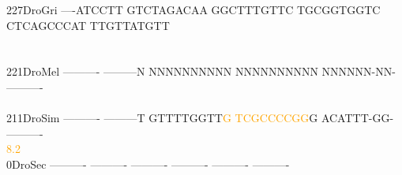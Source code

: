 \documentclass[11pt,twoside,reqno,a4paper]{article}
\begin{document}
{227\hspace*{1\charwidth}DroGri	----ATCCTT	GTCTAGACAA	GGCTTTGTTC	TGCGGTGGTC	CTCAGCCCAT	TTGTTATGTT	\\
\hspace*{4\charwidth}\hspace*{7\charwidth}\hspace*{1\charwidth}\hspace*{1\charwidth}\hspace*{1\charwidth}\hspace*{1\charwidth}\hspace*{1\charwidth}\hspace*{1\charwidth}\\
\\
221\hspace*{1\charwidth}DroMel	----------	---------N	NNNNNNNNNN	NNNNNNNNNN	NNNNNN-NN-	----------	\\
\hspace*{4\charwidth}\hspace*{7\charwidth}\hspace*{1\charwidth}\hspace*{1\charwidth}\hspace*{1\charwidth}\hspace*{1\charwidth}\hspace*{1\charwidth}\hspace*{1\charwidth}\\
211\hspace*{1\charwidth}DroSim	----------	---------T	GTTTTGGTT\textcolor{orange}{G}	\textcolor{orange}{T}\textcolor{orange}{C}\textcolor{orange}{G}\textcolor{orange}{C}\textcolor{orange}{C}\textcolor{orange}{C}\textcolor{orange}{C}\textcolor{orange}{G}\textcolor{orange}{G}G	ACATTT-GG-	----------	\\
\hspace*{4\charwidth}\hspace*{7\charwidth}\hspace*{1\charwidth}\hspace*{1\charwidth}\hspace*{29\charwidth}\textcolor{orange}{8.2}\hspace*{1\charwidth}\hspace*{1\charwidth}\hspace*{1\charwidth}\hspace*{1\charwidth}\\
0\hspace*{3\charwidth}DroSec	----------	----------	----------	----------	----------	----------	\\
}
\end{document}
